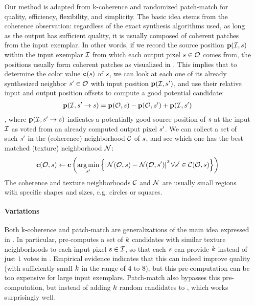 Our method is adapted from 
k-coherence \cite{Tong:2002:SBT} and randomized patch-match \cite{Barnes:2009:PRC} for quality, efficiency, flexibility, and simplicity.
The basic idea stems from the coherence observation: regardless of the exact synthesis algorithms used, as long as the output has sufficient quality, it is usually composed of coherent patches from the input exemplar.
In other words, if we record the source position $\mathbf{p}(\mathcal{I}, s{})$ within the input exemplar $\mathcal{I}$ from which each output pixel $s{} \in \mathcal{O}$ comes from, the positions usually form coherent patches as visualized in \cite{Wei:2002:TSF}.
This implies that to determine the color value $\mathbf{c}(s{})$ of $s{}$, we can look at each one of its already synthesized neighbor $s{}' \in \mathcal{O}$ with input position $\mathbf{p}(\mathcal{I}, s{}')$, and use their relative input and output position offsets to compute a good potential candidate:
\begin{align}
\mathbf{p}(\mathcal{I}, s{}' \rightarrow s{}) = \mathbf{p}(\mathcal{O}, s{}) - \mathbf{p}(\mathcal{O}, s{}') + \mathbf{p}(\mathcal{I}, s{}')
\label{eqn:coherence_offset}
\end{align}
, where $\mathbf{p}(\mathcal{I}, s{}' \rightarrow s{})$ indicates a potentially good source position of $s{}$ at the input $\mathcal{I}$ as voted from an already computed output pixel $s{}'$.
We can collect a set of such $s{}'$ in the (coherence) neighborhood $\mathcal{C}$ of $s{}$, and see which one has the best matched (texture) neighborhood $\mathcal{N}$:
\begin{align}
\mathbf{c}(\mathcal{O}, s{}) \leftarrow \mathbf{c}\left(\operatorname*{arg\,min}_{s{}'} \left\{\left|\mathcal{N}(\mathcal{O}, s{}) - \mathcal{N}(\mathcal{O}, s{}')\right|^2 \forall s{}' \in \mathcal{C}(\mathcal{O}, s{}) \right\} \right)
\label{eqn:coherence_synthesis}
\end{align}
The coherence and texture neighborhoods $\mathcal{C}$ and $\mathcal{N}$ are usually small regions with specific shapes and sizes, e.g. circles or squares.

\paragraph{Variations}

Both k-coherence \cite{Tong:2002:SBT} and patch-match \cite{Barnes:2009:PRC} are generalizations of the main idea expressed in .
In particular, \cite{Tong:2002:SBT} pre-computes a set of $k$ candidates with similar texture neighborhoods to each input pixel $s{} \in \mathcal{I}$, so that each $s{}$ can provide $k$ instead of just $1$ votes in .
Empirical evidence indicates that this can indeed improve quality (with sufficiently small $k$ in the range of 4 to 8), but this pre-computation can be too expensive for large input exemplars.
Patch-match \cite{Barnes:2009:PRC} also bypasses this pre-computation, but instead of adding $k$ random candidates to , which works surprisingly well.

